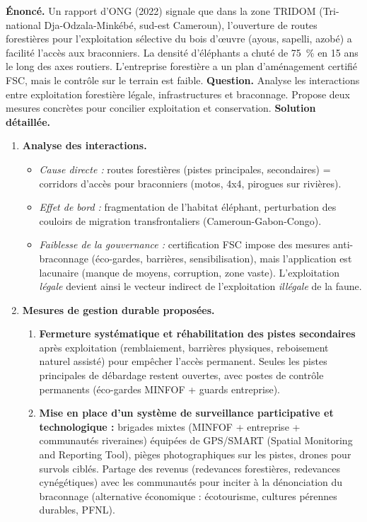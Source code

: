 \documentclass[11pt]{article}
\begin{document}
\begin{exoresolu}
\textbf{Énoncé.} Un rapport d'ONG (2022) signale que dans la zone TRIDOM (Tri-national Dja-Odzala-Minkébé, sud-est Cameroun), l'ouverture de routes forestières pour l'exploitation sélective du bois d'œuvre (ayous, sapelli, azobé) a facilité l'accès aux braconniers. La densité d'éléphants a chuté de \SI{75}{\%} en 15 ans le long des axes routiers. L'entreprise forestière a un plan d'aménagement certifié FSC, mais le contrôle sur le terrain est faible.
\textbf{Question.} Analyse les interactions entre exploitation forestière légale, infrastructures et braconnage. Propose deux mesures concrètes pour concilier exploitation et conservation.
\textbf{Solution détaillée.}
\begin{enumerate}
    \item \textbf{Analyse des interactions.}
    \begin{itemize}
        \item \textit{Cause directe :} routes forestières (pistes principales, secondaires) = corridors d'accès pour braconniers (motos, 4x4, pirogues sur rivières).
        \item \textit{Effet de bord :} fragmentation de l'habitat éléphant, perturbation des couloirs de migration transfrontaliers (Cameroun-Gabon-Congo).
        \item \textit{Faiblesse de la gouvernance :} certification FSC impose des mesures anti-braconnage (éco-gardes, barrières, sensibilisation), mais l'application est lacunaire (manque de moyens, corruption, zone vaste). L'exploitation \emph{légale} devient ainsi le vecteur indirect de l'exploitation \emph{illégale} de la faune.
    \end{itemize}
    \item \textbf{Mesures de gestion durable proposées.}
    \begin{enumerate}
        \item \textbf{Fermeture systématique et réhabilitation des pistes secondaires} après exploitation (remblaiement, barrières physiques, reboisement naturel assisté) pour empêcher l'accès permanent. Seules les pistes principales de débardage restent ouvertes, avec postes de contrôle permanents (éco-gardes MINFOF + guards entreprise).
        \item \textbf{Mise en place d'un système de surveillance participative et technologique :} brigades mixtes (MINFOF + entreprise + communautés riveraines) équipées de GPS/SMART (Spatial Monitoring and Reporting Tool), pièges photographiques sur les pistes, drones pour survols ciblés. Partage des revenus (redevances forestières, redevances cynégétiques) avec les communautés pour inciter à la dénonciation du braconnage (alternative économique : écotourisme, cultures pérennes durables, PFNL).
    \end{enumerate}
\end{enumerate}
\end{exoresolu}
\end{document}
